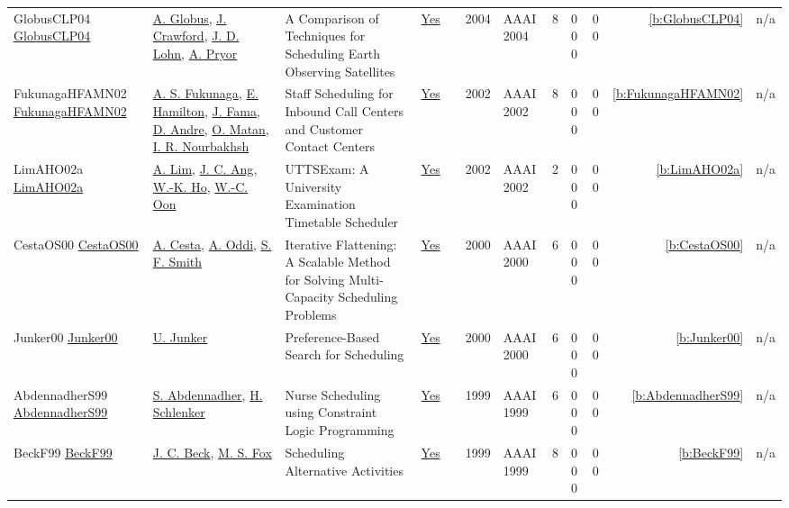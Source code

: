 {\begin{longtable}{>{\raggedright\arraybackslash}p{3cm}>{\raggedright\arraybackslash}p{4.5cm}>{\raggedright\arraybackslash}p{6.0cm}rrrp{2.5cm}rp{1cm}p{1cm}rr}
GlobusCLP04 \href{}{GlobusCLP04} & \hyperref[auth:a1337]{A. Globus}, \hyperref[auth:a1338]{J. Crawford}, \hyperref[auth:a1339]{J. D. Lohn}, \hyperref[auth:a1340]{A. Pryor} & A Comparison of Techniques for Scheduling Earth Observing Satellites & \href{../works/GlobusCLP04.pdf}{Yes} & \cite{GlobusCLP04} & 2004 & AAAI 2004 & 8 & 0 0 0 & 0 0 & \ref{b:GlobusCLP04} & n/a\\
FukunagaHFAMN02 \href{http://www.aaai.org/Library/AAAI/2002/aaai02-123.php}{FukunagaHFAMN02} & \hyperref[auth:a1328]{A. S. Fukunaga}, \hyperref[auth:a1329]{E. Hamilton}, \hyperref[auth:a1330]{J. Fama}, \hyperref[auth:a1331]{D. Andre}, \hyperref[auth:a1332]{O. Matan}, \hyperref[auth:a1333]{I. R. Nourbakhsh} & Staff Scheduling for Inbound Call Centers and Customer Contact Centers & \href{../works/FukunagaHFAMN02.pdf}{Yes} & \cite{FukunagaHFAMN02} & 2002 & AAAI 2002 & 8 & 0 0 0 & 0 0 & \ref{b:FukunagaHFAMN02} & n/a\\
LimAHO02a \href{http://www.aaai.org/Library/AAAI/2002/aaai02-175.php}{LimAHO02a} & \hyperref[auth:a279]{A. Lim}, \hyperref[auth:a1334]{J. C. Ang}, \hyperref[auth:a1335]{W.-K. Ho}, \hyperref[auth:a1336]{W.-C. Oon} & UTTSExam: {A} University Examination Timetable Scheduler & \href{../works/LimAHO02a.pdf}{Yes} & \cite{LimAHO02a} & 2002 & AAAI 2002 & 2 & 0 0 0 & 0 0 & \ref{b:LimAHO02a} & n/a\\
CestaOS00 \href{http://www.aaai.org/Library/AAAI/2000/aaai00-114.php}{CestaOS00} & \hyperref[auth:a284]{A. Cesta}, \hyperref[auth:a282]{A. Oddi}, \hyperref[auth:a298]{S. F. Smith} & Iterative Flattening: {A} Scalable Method for Solving Multi-Capacity Scheduling Problems & \href{../works/CestaOS00.pdf}{Yes} & \cite{CestaOS00} & 2000 & AAAI 2000 & 6 & 0 0 0 & 0 0 & \ref{b:CestaOS00} & n/a\\
Junker00 \href{http://www.aaai.org/Library/AAAI/2000/aaai00-139.php}{Junker00} & \hyperref[auth:a1327]{U. Junker} & Preference-Based Search for Scheduling & \href{../works/Junker00.pdf}{Yes} & \cite{Junker00} & 2000 & AAAI 2000 & 6 & 0 0 0 & 0 0 & \ref{b:Junker00} & n/a\\
AbdennadherS99 \href{http://www.aaai.org/Library/IAAI/1999/iaai99-118.php}{AbdennadherS99} & \hyperref[auth:a1318]{S. Abdennadher}, \hyperref[auth:a711]{H. Schlenker} & Nurse Scheduling using Constraint Logic Programming & \href{../works/AbdennadherS99.pdf}{Yes} & \cite{AbdennadherS99} & 1999 & AAAI 1999 & 6 & 0 0 0 & 0 0 & \ref{b:AbdennadherS99} & n/a\\
BeckF99 \href{http://www.aaai.org/Library/AAAI/1999/aaai99-097.php}{BeckF99} & \hyperref[auth:a89]{J. C. Beck}, \hyperref[auth:a302]{M. S. Fox} & Scheduling Alternative Activities & \href{../works/BeckF99.pdf}{Yes} & \cite{BeckF99} & 1999 & AAAI 1999 & 8 & 0 0 0 & 0 0 & \ref{b:BeckF99} & n/a\\

\end{longtable}}

